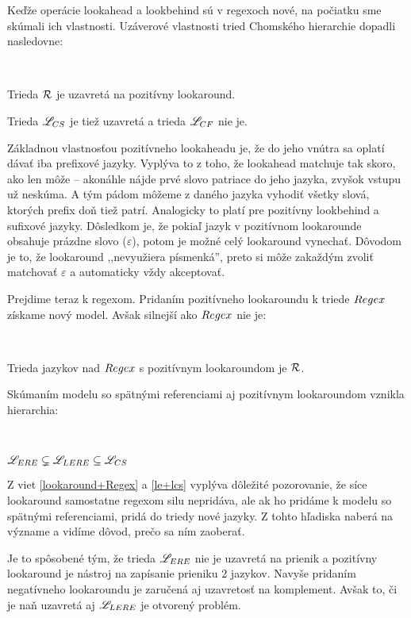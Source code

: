 Keďže operácie lookahead a lookbehind sú v regexoch nové, na počiatku sme skúmali ich vlastnosti. Uzáverové vlastnosti tried Chomského hierarchie dopadli nasledovne:
\begin{veta} \textbf{\emph{\cite[Veta 2.2.5.]{mojaBak}}}\label{lookaround+R} \ \par
Trieda ${\cal R}$ je uzavretá na pozitívny lookaround.
\end{veta}
Trieda $\mathscr{L}_{CS}$ je tiež uzavretá a trieda $\mathscr{L}_{CF}$ nie je.

Základnou vlastnosťou pozitívneho lookaheadu je, že do jeho vnútra sa oplatí dávať iba prefixové jazyky. Vyplýva to z toho, že lookahead matchuje tak skoro, ako len môže -- akonáhle nájde prvé slovo patriace do jeho jazyka, zvyšok vstupu už neskúma. A tým pádom môžeme z daného jazyka vyhodiť všetky slová, ktorých prefix doň tiež patrí. Analogicky to platí pre pozitívny lookbehind a sufixové jazyky. Dôsledkom je, že pokiaľ jazyk v pozitívnom lookarounde obsahuje prázdne slovo ($\varepsilon$), potom je možné celý lookaround vynechať. Dôvodom je to, že lookaround ,,nevyužiera písmenká'', preto si môže zakaždým zvoliť matchovať $\varepsilon$ a automaticky vždy akceptovať.

Prejdime teraz k regexom. Pridaním pozitívneho lookaroundu k triede $Regex$ získame nový model. Avšak silnejší ako $Regex$ nie je:
\begin{veta} \textbf{\emph{\cite[Veta 2.2.10.]{mojaBak}}}\label{lookaround+Regex} \ \par
Trieda jazykov nad $Regex$ s pozitívnym lookaroundom je ${\cal R}$.
\end{veta}

Skúmaním modelu so spätnými referenciami aj pozitívnym lookaroundom vznikla hierarchia:
\begin{veta}\textbf{\emph{\cite[Vety 2.2.13 a 2.2.14.]{mojaBak}}}\label{le+lcs} \ \par
$ \mathscr{L}_{ERE} \subsetneq \mathscr{L}_{LERE} \subseteq \mathscr{L}_{CS} $
\end{veta}

Z viet \ref{lookaround+Regex} a \ref{le+lcs} vyplýva dôležité pozorovanie, že síce lookaround samostatne regexom silu nepridáva, ale ak ho pridáme k modelu so spätnými referenciami, pridá do triedy nové jazyky. Z tohto hľadiska naberá na význame a vidíme dôvod, prečo sa ním zaoberať.

Je to spôsobené tým, že trieda $\mathscr{L}_{ERE}$ nie je uzavretá na prienik \cite{ExtendedRegexIntersec} a pozitívny lookaround je nástroj na zapísanie prieniku 2 jazykov. Navyše pridaním negatívneho lookaroundu je zaručená aj uzavretosť na komplement. Avšak to, či je naň uzavretá aj $\mathscr{L}_{LERE}$ je otvorený problém.


